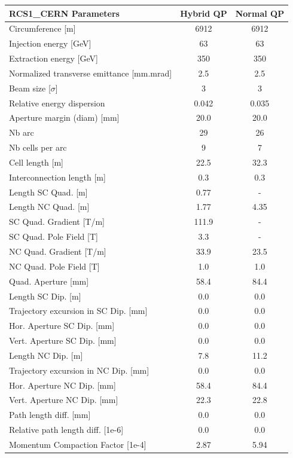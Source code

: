 \begin{tabular}{lcc}
\toprule
RCS1_CERN Parameters & Hybrid QP & Normal QP \\
\midrule
Circumference [m] & 6912 & 6912 \\
Injection energy [GeV] & 63 & 63 \\
Extraction energy [GeV] & 350 & 350 \\
Normalized transverse emittance [mm.mrad] & 2.5 & 2.5 \\
Beam size [$\sigma$] & 3 & 3 \\
Relative energy dispersion & 0.042 & 0.035 \\
Aperture margin (diam) [mm] & 20.0 & 20.0 \\
Nb arc & 29 & 26 \\
Nb cells per arc & 9 & 7 \\
Cell length [m] & 22.5 & 32.3 \\
Interconnection length [m] & 0.3 & 0.3 \\
Length SC Quad. [m] & 0.77 & - \\
Length NC Quad. [m] & 1.77 & 4.35 \\
SC Quad. Gradient [T/m] & 111.9 & - \\
SC Quad. Pole Field [T] & 3.3 & - \\
NC Quad. Gradient [T/m] & 33.9 & 23.5 \\
NC Quad. Pole Field [T] & 1.0 & 1.0 \\
Quad. Aperture [mm] & 58.4 & 84.4 \\
Length SC Dip. [m] & 0.0 & 0.0 \\
Trajectory excursion in SC Dip. [mm] & 0.0 & 0.0 \\
Hor. Aperture SC Dip. [mm] & 0.0 & 0.0 \\
Vert. Aperture SC Dip. [mm] & 0.0 & 0.0 \\
Length NC Dip. [m] & 7.8 & 11.2 \\
Trajectory excursion in NC Dip. [mm] & 0.0 & 0.0 \\
Hor. Aperture NC Dip. [mm] & 58.4 & 84.4 \\
Vert. Aperture NC Dip. [mm] & 22.3 & 22.8 \\
Path length diff. [mm] & 0.0 & 0.0 \\
Relative path length diff. [1e-6] & 0.0 & 0.0 \\
Momentum Compaction Factor [1e-4] & 2.87 & 5.94 \\
\bottomrule
\end{tabular}

